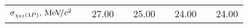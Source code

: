 \begin{table}[H]
{{\begin{tabular}{lrrrrrrrrrrrr}
    $\sigma_{\chi_{b1}(1P)}, {\mathrm{\,Me\kern -0.1em V\!/}c^2}$  && \multicolumn{2}{c}{27.00} && \multicolumn{2}{c}{25.00} && \multicolumn{2}{c}{24.00} && \multicolumn{2}{c}{24.00} \\





\end{tabular}}}
\end{table}
